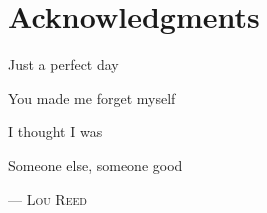 
\bigskip

\begingroup
\let\clearpage\relax
\let\cleardoublepage\relax
\let\cleardoublepage\relax
\chapter*{Acknowledgments}

\epigraph{
Just a perfect day

You made me forget myself

I thought I was

Someone else, someone good}{
--- \textsc{Lou Reed}}


\endgroup
